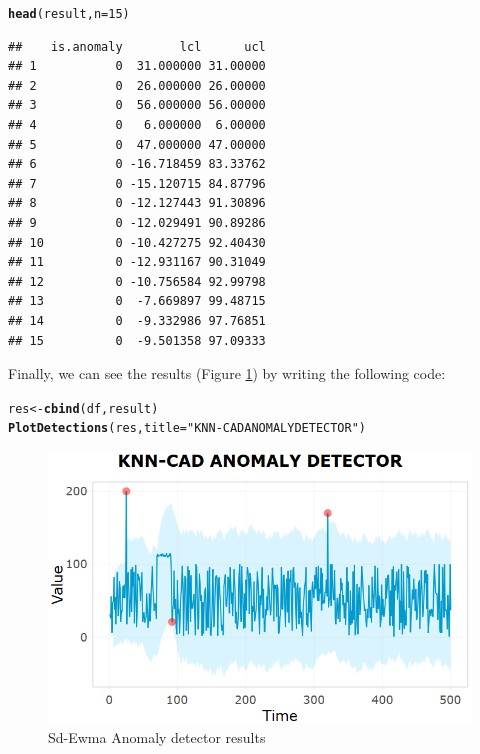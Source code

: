 \documentclass[a4paper]{article}\usepackage[]{graphicx}\usepackage[]{color}
\makeatletter
\newcommand{\hlnum}[1]{\textcolor[rgb]{0.686,0.059,0.569}{#1}}%
\newcommand{\hlstr}[1]{\textcolor[rgb]{0.192,0.494,0.8}{#1}}%
\newcommand{\hlstd}[1]{\textcolor[rgb]{0.345,0.345,0.345}{#1}}%
\newcommand{\hlkwb}[1]{\textcolor[rgb]{0.69,0.353,0.396}{#1}}%
\newcommand{\hlkwc}[1]{\textcolor[rgb]{0.333,0.667,0.333}{#1}}%
\newcommand{\hlkwd}[1]{\textcolor[rgb]{0.737,0.353,0.396}{\textbf{#1}}}%
\newenvironment{kframe}{%
 \def\at@end@of@kframe{}%
 \ifinner\ifhmode%
  \def\at@end@of@kframe{\end{minipage}}%
  \begin{minipage}{\columnwidth}%
 \fi\fi%
 \def\FrameCommand##1{\hskip\@totalleftmargin \hskip-\fboxsep
 \colorbox{shadecolor}{##1}\hskip-\fboxsep
     \hskip-\linewidth \hskip-\@totalleftmargin \hskip\columnwidth}%
 \MakeFramed {\advance\hsize-\width
   \@totalleftmargin\z@ \linewidth\hsize
   \@setminipage}}%
 {\par\unskip\endMakeFramed%
 \at@end@of@kframe}
\newenvironment{knitrout}{}{} %
\makeatother
\begin{document}
\begin{knitrout}
\color{fgcolor}\begin{kframe}
\begin{alltt}
\hlkwd{head}\hlstd{(result,} \hlkwc{n} \hlstd{=} \hlnum{15}\hlstd{)}
\end{alltt}
\begin{verbatim}
##    is.anomaly        lcl      ucl
## 1           0  31.000000 31.00000
## 2           0  26.000000 26.00000
## 3           0  56.000000 56.00000
## 4           0   6.000000  6.00000
## 5           0  47.000000 47.00000
## 6           0 -16.718459 83.33762
## 7           0 -15.120715 84.87796
## 8           0 -12.127443 91.30896
## 9           0 -12.029491 90.89286
## 10          0 -10.427275 92.40430
## 11          0 -12.931167 90.31049
## 12          0 -10.756584 92.99798
## 13          0  -7.669897 99.48715
## 14          0  -9.332986 97.76851
## 15          0  -9.501358 97.09333
\end{verbatim}
\end{kframe}
\end{knitrout}

Finally, we can see the results (Figure \ref{fig:result}) by writing the following code:

\begin{knitrout}
\color{fgcolor}\begin{kframe}
\begin{alltt}
\hlstd{res} \hlkwb{<-} \hlkwd{cbind}\hlstd{(df, result)}
\hlkwd{PlotDetections}\hlstd{(res,} \hlkwc{title} \hlstd{=} \hlstr{"KNN-CAD ANOMALY DETECTOR"}\hlstd{)}
\end{alltt}
\end{kframe}
\end{knitrout}

\begin{figure}[htbp]
\centering
\includegraphics[width=0.5\linewidth]{sdEwmaresult.PNG}
\caption{Sd-Ewma Anomaly detector results}
\label{fig:result}
\end{figure}
\end{document}
